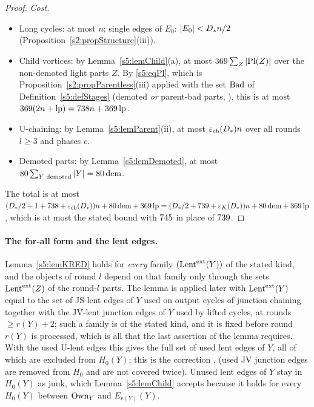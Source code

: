 \begin{proof}
\emph{Cost.}
\begin{itemize}
\item Long cycles: at most $n$; single edges of $E_0$: $|E_0|<D_{*} n/2$ (Proposition~\ref{s2:propStructure}(iii)).
\item Child vortices: by Lemma~\ref{s5:lemChild}(a), at most $369\sum_Z|\mathrm{Pl}(Z)|$ over the non-demoted light parts $Z$. By \eqref{s5:eqPl}, which is Proposition~\ref{s2:propParentless}(iii) applied with the set $\mathrm{Bad}$ of Definition~\ref{s5:defStages} (demoted \emph{or} parent-bad parts, ), this is at most $369(2n+\mathrm{lp})=738n+369\,\mathrm{lp}$.
\item U-chaining: by Lemma~\ref{s5:lemParent}(ii), at most $\varepsilon_{\mathrm{ch}}(D_{*})n$ over all rounds $l\ge3$ and phases $c$.
\item Demoted parts: by Lemma~\ref{s5:lemDemoted}, at most $80\sum_{Y\text{ demoted}}|Y|=80\,\mathrm{dem}$.
\end{itemize}
The total is at most $(D_{*}/2+1+738+\varepsilon_{\mathrm{ch}}(D_{*}))n+80\,\mathrm{dem}+369\,\mathrm{lp}=(D_{*}/2+739+\varepsilon_{K}(D_{*}))n+80\,\mathrm{dem}+369\,\mathrm{lp}$, which is at most the stated bound with $745$ in place of $739$.
\end{proof}

\paragraph{The for-all form and the lent edges.} Lemma~\ref{s5:lemKRED} holds for \emph{every} family $(\mathrm{Lent}^{\mathrm{ext}}(Y))$ of the stated kind, and the objects of round $l$ depend on that family only through the sets $\mathrm{Lent}^{\mathrm{ext}}(Z)$ of the round-$l$ parts. The lemma is applied later with $\mathrm{Lent}^{\mathrm{ext}}(Y)$ equal to the set of JS-lent edges of $Y$ used on output cycles of junction chaining together with the JV-lent junction edges of $Y$ used by lifted cycles, at rounds $\ge r(Y)+2$; such a family is of the stated kind, and it is fixed before round $r(Y)$ is processed, which is all that the last assertion of the lemma requires. With the used U-lent edges this gives the full set of used lent edges of $Y$, all of which are excluded from $H_0(Y)$; this is the correction ,  (used JV junction edges are removed from $H_0$ and are not covered twice). Unused lent edges of $Y$ stay in $H_0(Y)$ as junk, which Lemma~\ref{s5:lemChild} accepts because it holds for every $H_0(Y)$ between $\mathrm{Own}_Y$ and $E_{r(Y)}(Y)$.

